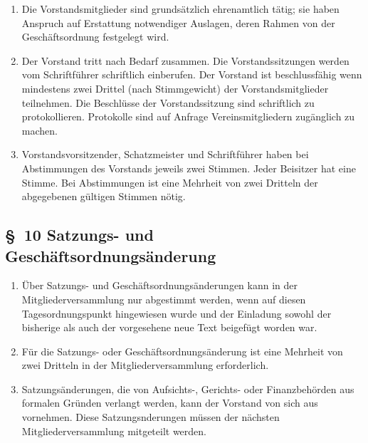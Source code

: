 \documentclass[10pt,a4paper]{scrartcl}
\begin{document}
\begin{enumerate}
	\item Die Vorstandsmitglieder sind grunds{\"a}tzlich ehrenamtlich t{\"a}tig; sie haben Anspruch
		auf Erstattung notwendiger Auslagen, deren Rahmen von der Gesch{\"a}ftsordnung
		festgelegt wird.
    \item Der Vorstand tritt nach Bedarf zusammen. Die Vorstands\-sitzungen
    werden vom Schrift\-f{\"u}h\-rer schriftlich einberufen. Der Vorstand ist
    beschluss\-f{\"a}hig wenn mindestens zwei Drittel (nach Stimmgewicht) der Vor\-stands\-mit\-glieder
    teilnehmen. Die Beschl{\"u}sse der Vor\-stands\-sitzung sind schriftlich zu
    protokollieren. Protokolle sind auf Anfrage Vereinsmitgliedern zu\-g{\"a}ng\-lich zu machen.
    \item Vorstandsvorsitzender, Schatzmeister und Schriftf{\"u}hrer haben bei
    Abstimmungen des Vorstands jeweils zwei Stimmen. Jeder Beisitzer hat eine
    Stimme. Bei Abstimmungen ist eine Mehrheit von zwei Dritteln der
    abgegebenen g{\"u}ltigen Stimmen n{\"o}tig.
\end{enumerate}
%
%
\subsection*{\S \ 10 Satzungs- und Gesch{\"a}ftsordnungs{\"a}nderung}
\begin{enumerate}
	\item {\"U}ber Satzungs- und Gesch{\"a}ftsordnungs{\"a}nderungen kann in der Mitgliederversammlung
		nur abgestimmt werden, wenn auf diesen Tagesordnungspunkt hingewiesen wurde und der
		Einladung sowohl der bisherige als auch der vorgesehene neue Text beigef{\"u}gt
		worden war.
	\item F{\"u}r die Satzungs- oder Gesch{\"a}ftsordnungs{\"a}nderung ist eine Mehrheit von zwei
		Dritteln in der Mitgliederversammlung erforderlich.
	\item Satzungs{\"a}nderungen, die von Aufsichts-, Gerichts- oder Finanz\-be\-h{\"o}r\-den aus formalen
		Gr{\"u}n\-den verlangt werden, kann der Vorstand von sich aus vornehmen. Diese
		Sat\-zungsn\-der\-ung\-en m{\"u}s\-sen der n{\"a}chs\-ten Mitgliederversammlung mitgeteilt
		werden.
\end{enumerate}
%
%
\end{document}
